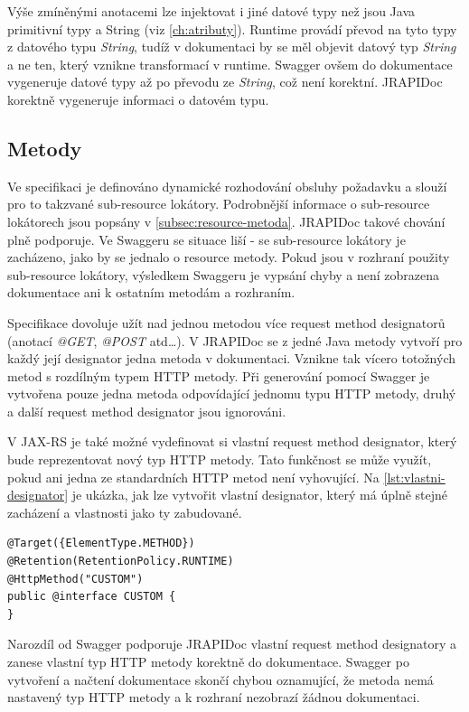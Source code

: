 \documentclass[11pt,twoside,a4paper]{book}
\begin{document}
Výše zmíněnými anotacemi lze injektovat i jiné datové typy než jsou Java
primitivní typy a String (viz \ref{ch:atributy}). Runtime provádí převod na tyto
typy z datového typu {\em String}, tudíž v dokumentaci by se měl objevit datový
typ {\em String} a ne ten, který vznikne transformací v runtime.
Swagger ovšem do dokumentace vygeneruje datové typy až po převodu ze {\em
String}, což není korektní. JRAPIDoc korektně vygeneruje informaci o datovém
typu.

\subsection{Metody}

Ve specifikaci je definováno dynamické rozhodování obsluhy požadavku a slouží
pro to takzvané sub-resource lokátory. Podrobnější informace o sub-resource
lokátorech jsou popsány v \ref{subsec:resource-metoda}. JRAPIDoc takové chování
plně podporuje. Ve Swaggeru se situace liší - se sub-resource lokátory  je
zacházeno, jako by se jednalo o resource metody. Pokud jsou v rozhraní
použity sub-resource lokátory, výsledkem Swaggeru je vypsání chyby a není 
zobrazena dokumentace ani k ostatním metodám a rozhraním.

Specifikace dovoluje užít nad jednou metodou více request method designatorů
(anotací {\em @GET}, {\em @POST} atd\ldots). V JRAPIDoc se z jedné Java metody
vytvoří pro každý její designator jedna metoda v dokumentaci. Vznikne tak vícero
totožných metod s rozdílným typem HTTP metody. Při generování pomocí Swagger je
vytvořena pouze jedna metoda odpovídající jednomu typu HTTP metody, druhý a
další request method designator jsou ignorováni.

V JAX-RS je také možné vydefinovat si vlastní request method designator, který
bude reprezentovat nový typ HTTP metody. Tato funkčnost se může využít, pokud
ani jedna ze standardních HTTP metod není vyhovující. Na
\ref{lst:vlastni-designator} je ukázka, jak lze vytvořit vlastní designator,
který má úplně stejné zacházení a vlastnosti jako ty zabudované.

\begin{lstlisting}[frame=single, caption={Vlastní request method
designator},label={lst:vlastni-designator}] 
@Target({ElementType.METHOD})
@Retention(RetentionPolicy.RUNTIME)
@HttpMethod("CUSTOM")
public @interface CUSTOM {
}
\end{lstlisting}

Narozdíl od Swagger podporuje JRAPIDoc vlastní request method designatory a
zanese vlastní typ HTTP metody korektně do dokumentace. Swagger po vytvoření a
načtení dokumentace skončí chybou oznamující, že metoda nemá nastavený typ HTTP
metody a k rozhraní nezobrazí žádnou dokumentaci.
\end{document}
